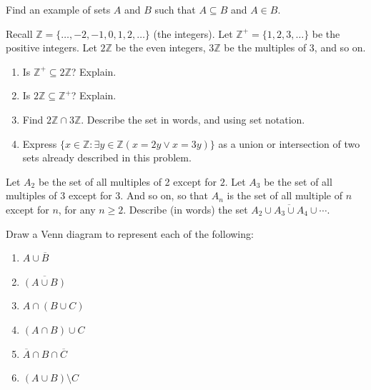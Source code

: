 \documentclass[10pt,]{book}
\theoremstyle{plain}
\theoremstyle{definition}
\theoremstyle{definition}
\theoremstyle{definition}
\theoremstyle{definition}
\numberwithin{equation}{chapter}
\def\Z{\mathbb Z}
\def\st{:}
\def\bar{\overline}
\begin{document}
\begin{divisionexercise}{4}\hypertarget{exercise-190}{}
\hypertarget{p-1658}{}%
Find an example of sets \(A\) and \(B\) such that \(A \subseteq B\) and \(A \in B\).%
\end{divisionexercise}%
\begin{divisionexercise}{5}\hypertarget{exercise-191}{}
\hypertarget{p-1660}{}%
Recall \(\Z = \{\ldots,-2,-1,0, 1,2,\ldots\}\) (the integers). Let \(\Z^+ = \{1, 2, 3, \ldots\}\) be the positive integers. Let \(2\Z\) be the even integers, \(3\Z\) be the multiples of 3, and so on.%
\par
\hypertarget{p-1661}{}%
\leavevmode%
\begin{enumerate}[label=(\alph*)]
\item\hypertarget{li-500}{}\hypertarget{p-1662}{}%
Is \(\Z^+ \subseteq 2\Z\)? Explain.%
\item\hypertarget{li-501}{}\hypertarget{p-1663}{}%
Is \(2\Z \subseteq \Z^+\)? Explain.%
\item\hypertarget{li-502}{}\hypertarget{p-1664}{}%
Find \(2\Z \cap 3\Z\). Describe the set in words, and using set notation.%
\item\hypertarget{li-503}{}\hypertarget{p-1665}{}%
Express \(\{x \in \Z \st \exists y\in \Z (x = 2y \vee x = 3y)\}\) as a union or intersection of two sets already described in this problem.%
\end{enumerate}
%
\end{divisionexercise}%
\begin{divisionexercise}{6}\hypertarget{exercise-192}{}
\hypertarget{p-1669}{}%
Let \(A_2\) be the set of all multiples of 2 except for \(2\). Let \(A_3\) be the set of all multiples of 3 except for 3. And so on, so that \(A_n\) is the set of all multiple of \(n\) except for \(n\), for any \(n \ge 2\). Describe (in words) the set \(\bar{A_2 \cup A_3 \cup A_4 \cup \cdots}\).%
\end{divisionexercise}%
\begin{divisionexercise}{7}\hypertarget{exercise-193}{}
\hypertarget{p-1670}{}%
Draw a Venn diagram to represent each of the following: \leavevmode%
\begin{enumerate}[label=(\alph*)]
\item\hypertarget{li-508}{}\(A \cup \bar B\)%
\item\hypertarget{li-509}{}\(\bar{(A \cup B)}\)%
\item\hypertarget{li-510}{}\(A \cap (B \cup C)\)%
\item\hypertarget{li-511}{}\((A \cap B) \cup C\)%
\item\hypertarget{li-512}{}\(\bar A \cap B \cap \bar C\)%
\item\hypertarget{li-513}{}\((A \cup B) \setminus C\)%
\end{enumerate}
%
\end{divisionexercise}%
\end{document}
